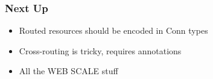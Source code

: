 \begin{frame}
\end{frame}

\begin{frame}
\end{frame}

\begin{frame}
  \frametitle{Next Up}
  \begin{itemize}
    \item Routed resources should be encoded in Conn types
    \item Cross-routing is tricky, requires annotations
    \item All the WEB SCALE stuff
  \end{itemize}
\end{frame}

\begin{frame}
\end{frame}

\begin{frame}
  \titlepage
\end{frame}

